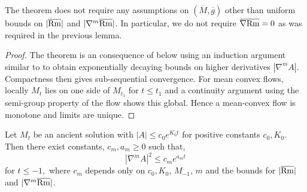 \documentclass{amsart}
\begin{document}
\begin{rem}
The theorem does not require any assumptions on \((\overline{M}, \overline{g})\) other than uniform bounds on \(|\overline{\operatorname{Rm}}|\) and \(|\nabla^m \overline{\operatorname{Rm}}|\). In particular, we do not require \(\overline{\nabla} \overline{\operatorname{Rm}} = 0\) as was required in the previous lemma.
\end{rem}

\begin{proof}
The theorem is an consequence of  below using an induction argument similar to \cite[Section 13]{Hamilton:/1982} to obtain exponentially decaying bounds on higher derivatives \(|\nabla^m A|\). Compactness then gives sub-sequential convergence. For mean convex flows, locally \(M_t\) lies on one side of \(M_{t_1}\) for \(t \leq t_1\) and a continuity argument using the semi-group property of the flow shows this global. Hence a mean-convex flow is monotone and limits are unique.
\end{proof}

\begin{lemma}
\label{lem:higher_derivative_bounds}
Let \(M_t\) be an ancient solution with \(|A| \leq c_0 e^{K_0t}\) for positive constants \(c_0, K_0\). Then there exist constants, \(c_m, a_m \geq 0\) such that,
\begin{equation}
\label{eq:higher_derivative_bounds}
|\nabla^mA|^2 \leq c_m e^{a_m t}
\end{equation}
for $t\le -1,$ where $c_m$ depends only on $c_0,K_0$, $M_{-1}$, $m$ and the bounds for \(|\overline{\operatorname{Rm}}|\) and \(|\nabla^m \overline{\operatorname{Rm}}|\). 
\end{lemma}
\end{document}
